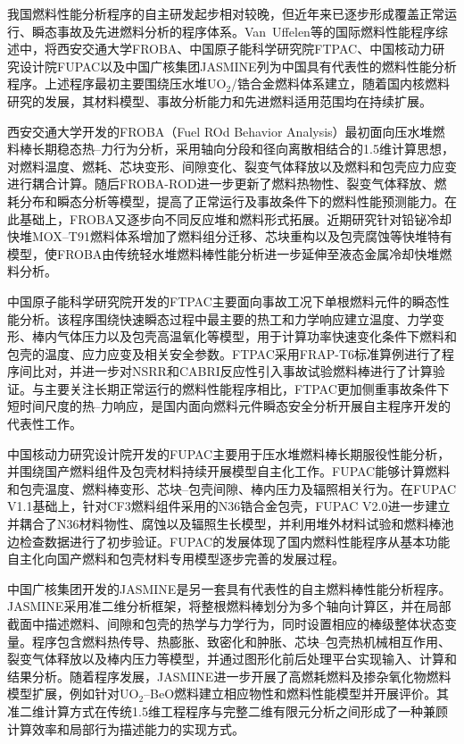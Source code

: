 我国燃料性能分析程序的自主研发起步相对较晚，但近年来已逐步形成覆盖正常运行、瞬态事故及先进燃料分析的程序体系。Van~Uffelen等\cite{vanuffelenReviewFuelPerformance2019}的国际燃料性能程序综述中，将西安交通大学FROBA、中国原子能科学研究院FTPAC、中国核动力研究设计院FUPAC以及中国广核集团JASMINE列为中国具有代表性的燃料性能分析程序。上述程序最初主要围绕压水堆UO$_2$/锆合金燃料体系建立，随着国内核燃料研究的发展，其材料模型、事故分析能力和先进燃料适用范围均在持续扩展。

西安交通大学开发的FROBA（Fuel ROd Behavior Analysis）最初面向压水堆燃料棒长期稳态热--力行为分析，采用轴向分段和径向离散相结合的1.5维计算思想，对燃料温度、燃耗、芯块变形、间隙变化、裂变气体释放以及燃料和包壳应力应变进行耦合计算\cite{yuDevelopmentFuelROd2012}。随后FROBA-ROD进一步更新了燃料热物性、裂变气体释放、燃耗分布和瞬态分析等模型，提高了正常运行及事故条件下的燃料性能预测能力\cite{liaoModificationUpdateFROBA2019}。在此基础上，FROBA又逐步向不同反应堆和燃料形式拓展。近期研究针对铅铋冷却快堆MOX--T91燃料体系增加了燃料组分迁移、芯块重构以及包壳腐蚀等快堆特有模型，使FROBA由传统轻水堆燃料棒性能分析进一步延伸至液态金属冷却快堆燃料分析\cite{dengUpgradeFROBACode2026}。

中国原子能科学研究院开发的FTPAC主要面向事故工况下单根燃料元件的瞬态性能分析。该程序围绕快速瞬态过程中最主要的热工和力学响应建立温度、力学变形、棒内气体压力以及包壳高温氧化等模型，用于计算功率快速变化条件下燃料和包壳的温度、应力应变及相关安全参数\cite{hanValidationApplicationFTPAC2014}。FTPAC采用FRAP-T6标准算例进行了程序间比对，并进一步对NSRR和CABRI反应性引入事故试验燃料棒进行了计算验证。与主要关注长期正常运行的燃料性能程序相比，FTPAC更加侧重事故条件下短时间尺度的热--力响应，是国内面向燃料元件瞬态安全分析开展自主程序开发的代表性工作。

中国核动力研究设计院开发的FUPAC主要用于压水堆燃料棒长期服役性能分析，并围绕国产燃料组件及包壳材料持续开展模型自主化工作。FUPAC能够计算燃料和包壳温度、燃料棒变形、芯块--包壳间隙、棒内压力及辐照相关行为。在FUPAC V1.1基础上，针对CF3燃料组件采用的N36锆合金包壳，FUPAC V2.0进一步建立并耦合了N36材料物性、腐蚀以及辐照生长模型，并利用堆外材料试验和燃料棒池边检查数据进行了初步验证\cite{xingFuelRodAnalysis2021}。FUPAC的发展体现了国内燃料性能程序从基本功能自主化向国产燃料和包壳材料专用模型逐步完善的发展过程。

中国广核集团开发的JASMINE是另一套具有代表性的自主燃料棒性能分析程序。JASMINE采用准二维分析框架，将整根燃料棒划分为多个轴向计算区，并在局部截面中描述燃料、间隙和包壳的热学与力学行为，同时设置相应的棒级整体状态变量\cite{weiModelingFuelRodJASMINE2017}。程序包含燃料热传导、热膨胀、致密化和肿胀、芯块--包壳热机械相互作用、裂变气体释放以及棒内压力等模型，并通过图形化前后处理平台实现输入、计算和结果分析。随着程序发展，JASMINE进一步开展了高燃耗燃料及掺杂氧化物燃料模型扩展，例如针对UO$_2$--BeO燃料建立相应物性和燃料性能模型并开展评价\cite{wangAnalysisAssessmentBeO2024}。其准二维计算方式在传统1.5维工程程序与完整二维有限元分析之间形成了一种兼顾计算效率和局部行为描述能力的实现方式。

